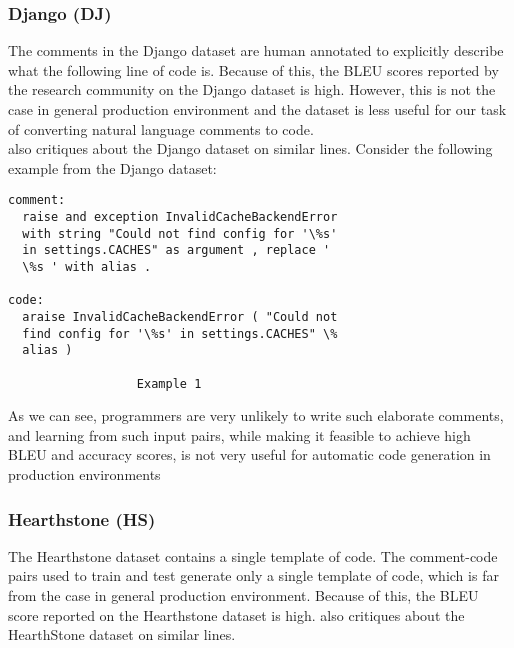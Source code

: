 \documentclass{IEEEtran}
\begin{document}
      \subsubsection{Django (DJ)}
      The comments in the Django dataset are human annotated to explicitly describe what 
      the following line of code is. Because of this, the BLEU scores reported by the 
      research community on the Django dataset is high. However, this is not the case in general 
      production environment and the dataset is less useful for our task of converting natural 
      language comments to code. \\
      \hspace*{4mm}\cite{barone2017} also critiques about the Django dataset on 
      similar lines.
      Consider the following example from the Django dataset:
      \begin{lstlisting}[frame=single,basicstyle=\small]
comment:
  raise and exception InvalidCacheBackendError 
  with string "Could not find config for '\%s' 
  in settings.CACHES" as argument , replace ' 
  \%s ' with alias .

code:
  araise InvalidCacheBackendError ( "Could not 
  find config for '\%s' in settings.CACHES" \% 
  alias )

                  Example 1
      \end{lstlisting}

      As we can see, programmers are very unlikely to write such elaborate comments, 
      and learning from such input pairs, while making it feasible to achieve high 
      BLEU and accuracy scores, is not very useful for automatic code generation  
      in production environments

      \subsubsection{Hearthstone (HS)}
        The Hearthstone dataset contains a single template of code. The comment-code
        pairs used to train and test generate only a single template of code, which
        is far from the case in general production environment. Because of this,
        the BLEU score reported on the Hearthstone dataset is high. \cite{barone2017} also 
        critiques about the HearthStone dataset on similar lines.
\end{document}
